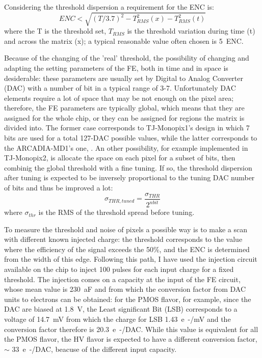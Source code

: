         Considering the threshold dispersion a requirement for the ENC is: 
        \begin{equation}
            ENC < \sqrt{(T/3.7)^2 - T_{RMS} ^2 (x) - T_{RMS} ^2 (t)}
        \end{equation}
        where the T is the threshold set, $T_{RMS}$ is the threshold variation during time (t) and across the matrix (x); a typical reasonable value often chosen is \SI{5}{ENC}.

        Because of the changing of the 'real' threshold, the possibility of changing and adapting the setting parameters of the FE, both in time and in space is desiderable: these parameters are usually set by Digital to Analog Converter (DAC) with a number of bit in a typical range of 3-7.
        Unfortunately DAC elements require a lot of space that may be not enough on the pixel area; therefore, the FE parameters are typically global, which means that they are assigned for the whole chip, or they can be assigned for regions the matrix is divided into. 
        The former case corresponds to TJ-Monopix1's design in which 7 bits are used for a total 127-DAC possible values, while the latter corresponds to the ARCADIA-MD1's one, . 
        An other possibility, for example implemented in TJ-Monopix2, is allocate the space on each pixel for a subset of bits, then combinig the global threshold with a fine tuning. 
        If so, the threshold dispersion after tuning is expected to be inversely proportional to the tuning DAC number of bits and thus be improved a lot:
        \begin{equation}
            \sigma_{THR, tuned} = \frac{\sigma_{THR}}{2^{n bit}}
        \end{equation}    
        where $\sigma_{thr}$ is the RMS of the threshold spread before tuning.

        To measure the threshold and noise of pixels a possible way is to make a scan with different known injected charge: the threshold corresponds to the value where the efficiency of the signal exceeds the 50\%, and the ENC is determined from the width of this edge.        
        Following this path, I have used the injection circuit available on the chip to inject 100 pulses for each input charge for a fixed threshold.
        The injection comes on a capacity at the input of the FE circuit, whose mean value is \SI{230}{aF} and from which the conversion factor from DAC units to electrons can be obtained: for the PMOS flavor, for example, since the DAC are biased at \SI{1.8}{V}, the Least significant Bit (LSB) corresponds to a voltage of \SI{14.7}{mV} from which the charge for LSB \SI{1.43}{e-/mV} and the conversion factor therefore is \SI{20.3}{e-/DAC}.     
        While this value is equivalent for all the PMOS flavor, the HV flavor is expected to have a different conversion factor, $\sim$ \SI{33}{e-/DAC}, beacuse of the different input capacity. 

